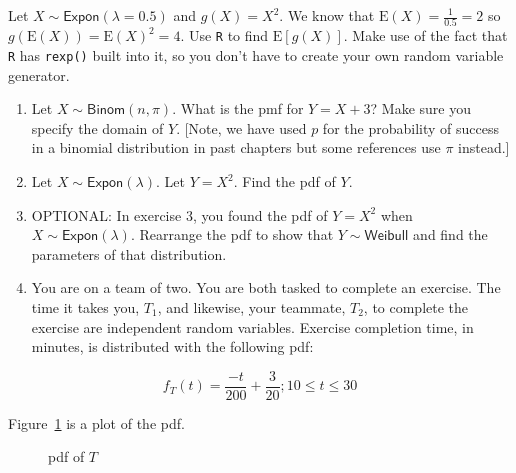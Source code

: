 \documentclass[
  letterpaper,
  DIV=11,
  numbers=noendperiod]{scrreprt}
\begin{document}
Let \(X\sim \textsf{Expon}(\lambda=0.5)\) and \(g(X)=X^2\). We know that
\(\mbox{E}(X)=\frac{1}{0.5}=2\) so \(g(\mbox{E}(X))=\mbox{E}(X)^2=4\).
Use \texttt{R} to find \(\mbox{E}[g(X)]\). Make use of the fact that
\texttt{R} has \texttt{rexp()} built into it, so you don't have to
create your own random variable generator.

\begin{enumerate}
\def\labelenumi{\arabic{enumi}.}
\setcounter{enumi}{1}
\item
  Let \(X\sim \textsf{Binom}(n,\pi)\). What is the pmf for \(Y = X+3\)?
  Make sure you specify the domain of \(Y\). {[}Note, we have used \(p\)
  for the probability of success in a binomial distribution in past
  chapters but some references use \(\pi\) instead.{]}
\item
  Let \(X\sim \textsf{Expon}(\lambda)\). Let \(Y=X^2\). Find the pdf of
  \(Y\).
\item
  OPTIONAL: In exercise 3, you found the pdf of \(Y=X^2\) when
  \(X\sim \textsf{Expon}(\lambda)\). Rearrange the pdf to show that
  \(Y\sim \textsf{Weibull}\) and find the parameters of that
  distribution.
\item
  You are on a team of two. You are both tasked to complete an exercise.
  The time it takes you, \(T_1\), and likewise, your teammate, \(T_2\),
  to complete the exercise are independent random variables. Exercise
  completion time, in minutes, is distributed with the following pdf:
\end{enumerate}

\[
f_T(t)= \frac{-t}{200}+\frac{3}{20}; 10 \leq t \leq30
\]

Figure~\ref{fig-fig1} is a plot of the pdf.

\begin{figure}


\caption{\label{fig-fig1}pdf of \(T\)}

\end{figure}%
\end{document}
